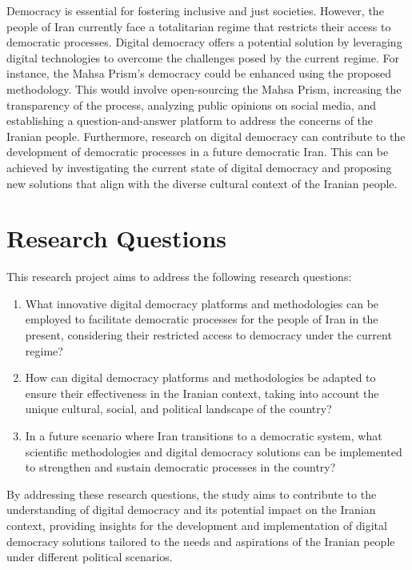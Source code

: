 \documentclass{IEEEtran}
\begin{document}
Democracy is essential for fostering inclusive and just societies. However, the people of Iran currently face a totalitarian regime that restricts their access to democratic processes. Digital democracy offers a potential solution by leveraging digital technologies to overcome the challenges posed by the current regime.
For instance, the Mahsa Prism's democracy could be enhanced using the proposed methodology. This would involve open-sourcing the Mahsa Prism, increasing the transparency of the process, analyzing public opinions on social media, and establishing a question-and-answer platform to address the concerns of the Iranian people.
Furthermore, research on digital democracy can contribute to the development of democratic processes in a future democratic Iran. This can be achieved by investigating the current state of digital democracy and proposing new solutions that align with the diverse cultural context of the Iranian people.

\section{Research Questions}

This research project aims to address the following research questions:

\begin{enumerate}
\item What innovative digital democracy platforms and methodologies can be employed to facilitate democratic processes for the people of Iran in the present, considering their restricted access to democracy under the current regime?
\item How can digital democracy platforms and methodologies be adapted to ensure their effectiveness in the Iranian context, taking into account the unique cultural, social, and political landscape of the country?
\item In a future scenario where Iran transitions to a democratic system, what scientific methodologies and digital democracy solutions can be implemented to strengthen and sustain democratic processes in the country?
\end{enumerate}

By addressing these research questions, the study aims to contribute to the understanding of digital democracy and its potential impact on the Iranian context, providing insights for the development and implementation of digital democracy solutions tailored to the needs and aspirations of the Iranian people under different political scenarios.
\end{document}
